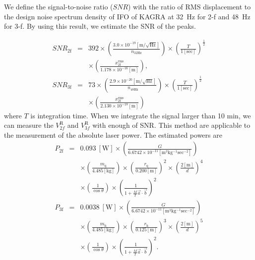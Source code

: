 \documentclass[%
 reprint,
superscriptaddress,
 amsmath,amssymb,
 aps,
]{revtex4-1}
\begin{document}
We define the signal-to-noise ratio ($\!S\!N\!R$) with the ratio of RMS displacement to the design noise spectrum density of IFO of KAGRA at 32~Hz for 2-f and 48~Hz for 3-f.
By using this result, we estimate the SNR of the peaks.

\footnotesize
\begin{eqnarray}
\!S\!N\!R_{\mathrm{2f}}&=&392 \times \left(\frac{3.0 \times 10^{-19} [\mathrm{m/\sqrt{Hz}}]}{n_{\mathrm{32Hz}}} \right)  \times \left(\frac{T}{1 [\mathrm{sec}]} \right)^{\frac{1}{2}} \nonumber \\
 &&\times \left(\frac{x_{\mathrm{2f}}^{\mathrm{rms}}}{1.178 \times 10^{-16}\mathrm{[m]} }  \right),   \\
\!S\!N\!R_{\mathrm{3f}}&=&73 \times \left(\frac{2.9 \times 10^{-20} [\mathrm{m/\sqrt{Hz}}]}{n_{\mathrm{48Hz}}} \right) \times \left(\frac{T}{1 [\mathrm{sec}]} \right)^{\frac{1}{2}}  \nonumber \\ 
&&\times \left(\frac{x_{\mathrm{2f}}^{\mathrm{rms}}}{2.130 \times 10^{-18}\mathrm{[m] }} \right)  
\end{eqnarray}
\normalsize
where $T$ is integration time. When we integrate the signal larger than 10 min, we can measure the $V^{\mathrm{R}}_{2f}$ and $V^{\mathrm{R}}_{3f}$ with enough of SNR.
This method are applicable to the measurement of the absolute laser power. The estimated powers are
\footnotesize
\begin{eqnarray}
P_{\mathrm{2f}}&=&0.093 ~\mathrm{[W]}\times \left( \frac{G}{6.6742 \times 10^{-11} \mathrm{[m^3kg^{-1}sec^{-2}]}} \right) \nonumber \\
&& \times \left( \frac{m_{\mathrm{q}}}{4.485 \mathrm{[kg]}} \right) \times \left( \frac{r_{\mathrm{q}}}{0.200 \mathrm{[m]}} \right)^2 \times \left( \frac{2\mathrm{[m]}}{d} \right)^4 \nonumber \\ &&\times \left( \frac{1}{\cos{\theta}} \right) \times \left( \frac{1}{1+\frac{M}{I}\vec{a}\cdot \vec{b}} \right)^2\\
P_{\mathrm{3f}}&=&0.0038~\mathrm{[W]} \times \left( \frac{G}{6.6742 \times 10^{-11} \mathrm{[m^3kg^{-1}sec^{-2}]}} \right) \nonumber \\
&& \times \left( \frac{m_{\mathrm{h}}}{4.485 \mathrm{[kg]}} \right) \times \left( \frac{r_{\mathrm{h}}}{0.125 \mathrm{[m]}} \right)^3 \times \left( \frac{2\mathrm{[m]}}{d} \right)^5 \nonumber \\ &&\times \left( \frac{1}{\cos{\theta}} \right) \times \left( \frac{1}{1+\frac{M}{I}\vec{a}\cdot \vec{b}} \right)^2.
\end{eqnarray}
\end{document}
